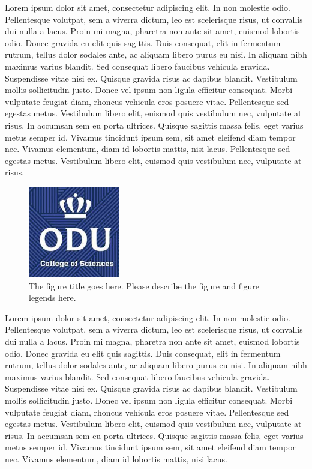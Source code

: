 Lorem ipsum dolor sit amet, consectetur adipiscing elit. In non molestie odio. Pellentesque volutpat, sem a viverra dictum, leo est scelerisque risus, ut convallis dui nulla a lacus. Proin mi magna, pharetra non ante sit amet, euismod lobortis odio. Donec gravida eu elit quis sagittis. Duis consequat, elit in fermentum rutrum, tellus dolor sodales ante, ac aliquam libero purus eu nisi. In aliquam nibh maximus varius blandit. Sed consequat libero faucibus vehicula gravida. Suspendisse vitae nisi ex. Quisque gravida risus ac dapibus blandit. Vestibulum mollis sollicitudin justo. Donec vel ipsum non ligula efficitur consequat. Morbi vulputate feugiat diam, rhoncus vehicula eros posuere vitae. Pellentesque sed egestas metus. Vestibulum libero elit, euismod quis vestibulum nec, vulputate at risus. In accumsan sem eu porta ultrices. Quisque sagittis massa felis, eget varius metus semper id. Vivamus tincidunt ipsum sem, sit amet eleifend diam tempor nec. Vivamus elementum, diam id lobortis mattis, nisi lacus. Pellentesque sed egestas metus. Vestibulum libero elit, euismod quis vestibulum nec, vulputate at risus.

\begin{figure}[tbh]
  \centering
  \includegraphics[height=4cm]{Figures/cos1.jpeg}
  \caption[The figure title goes here.]{The figure title goes here. Please describe the figure and figure legends here.}
  \label{fig:cos1_9}
\end{figure}


Lorem ipsum dolor sit amet, consectetur adipiscing elit. In non molestie odio. Pellentesque volutpat, sem a viverra dictum, leo est scelerisque risus, ut convallis dui nulla a lacus. Proin mi magna, pharetra non ante sit amet, euismod lobortis odio. Donec gravida eu elit quis sagittis. Duis consequat, elit in fermentum rutrum, tellus dolor sodales ante, ac aliquam libero purus eu nisi. In aliquam nibh maximus varius blandit. Sed consequat libero faucibus vehicula gravida. Suspendisse vitae nisi ex. Quisque gravida risus ac dapibus blandit. Vestibulum mollis sollicitudin justo. Donec vel ipsum non ligula efficitur consequat. Morbi vulputate feugiat diam, rhoncus vehicula eros posuere vitae. Pellentesque sed egestas metus. Vestibulum libero elit, euismod quis vestibulum nec, vulputate at risus. In accumsan sem eu porta ultrices. Quisque sagittis massa felis, eget varius metus semper id. Vivamus tincidunt ipsum sem, sit amet eleifend diam tempor nec. Vivamus elementum, diam id lobortis mattis, nisi lacus.

